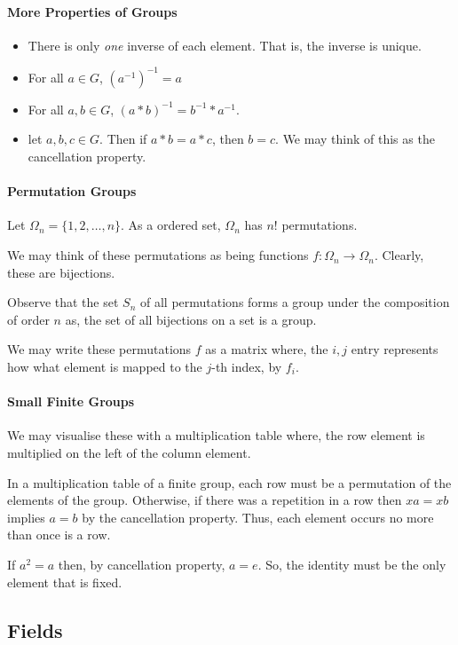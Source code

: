 \paragraph{More Properties of Groups}
\begin{itemize}
    \item There is only \textit{one} inverse of each element. That is,
    the inverse is unique.
    \item For all \(a\in G\), \(\left(a^{-1}\right)^{-1} = a\)
    \item For all \(a, b \in G\), \(
        \left(a*b\right)^{-1} = b^{-1} * a^{-1}.
    \)
    \item let \(a, b, c \in G\). Then if \(
        a * b = a * c
    \), then \(b = c\).
    We may think of this as the cancellation property.
\end{itemize}

\paragraph{Permutation Groups}
Let \(\Omega_n = \{1, 2, \dots, n\}\). As a ordered set, \(\Omega_n\)
has \(n!\) permutations.

We may think of these permutations as being functions
\(f: \Omega_n \to \Omega_n\). Clearly, these are bijections.

Observe that the set \(S_n\) of all permutations forms a group under the
composition of order \(n\) as, the set of all bijections on a set is a
group.

We may write these permutations \(f\) as a matrix where, the \(i,j\)
entry represents how what element is mapped to the \(j\)-th index, by \(f_i\).

\paragraph{Small Finite Groups}
We may visualise these with a multiplication table where,
the row element is multiplied on the left of the column element.

In a multiplication table of a finite group, each row must be a permutation
of the elements of the group. Otherwise, if there was a repetition in a row
then \(xa = xb\) implies \(a = b\) by the cancellation property.
Thus, each element occurs no more than once is a row.

If \(a^2 = a\) then, by cancellation property, \(a = e\). So,
the identity must be the only element that is fixed.


\subsection{Fields}

